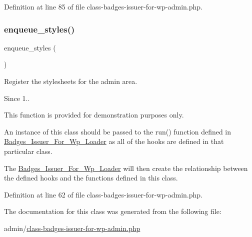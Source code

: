 Definition at line 85 of file class-\/badges-\/issuer-\/for-\/wp-\/admin.\+php.

\mbox{\label{class_badges___issuer___for___wp___admin_a6ec94168591737dfca849a6934db3cdf}} 
\subsubsection{\texorpdfstring{enqueue\+\_\+styles()}{enqueue\_styles()}}
{\footnotesize\ttfamily enqueue\+\_\+styles (\begin{DoxyParamCaption}{ }\end{DoxyParamCaption})}

Register the stylesheets for the admin area.

\begin{DoxySince}{Since}
1.. 
\end{DoxySince}
This function is provided for demonstration purposes only.

An instance of this class should be passed to the run() function defined in \hyperlink{class_badges___issuer___for___wp___loader}{Badges\+\_\+\+Issuer\+\_\+\+For\+\_\+\+Wp\+\_\+\+Loader} as all of the hooks are defined in that particular class.

The \hyperlink{class_badges___issuer___for___wp___loader}{Badges\+\_\+\+Issuer\+\_\+\+For\+\_\+\+Wp\+\_\+\+Loader} will then create the relationship between the defined hooks and the functions defined in this class.

Definition at line 62 of file class-\/badges-\/issuer-\/for-\/wp-\/admin.\+php.



The documentation for this class was generated from the following file\+:\begin{DoxyCompactItemize}
\item 
admin/\hyperlink{class-badges-issuer-for-wp-admin_8php}{class-\/badges-\/issuer-\/for-\/wp-\/admin.\+php}\end{DoxyCompactItemize}

